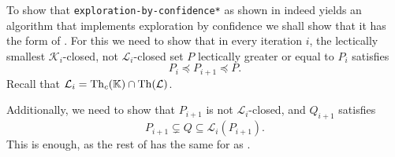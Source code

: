 To show that \lstinline{exploration-by-confidence*} as shown in
 indeed yields an algorithm that implements
exploration by confidence we shall show that it has the form of
.  For this we need to show that in every
iteration $i$, the lectically smallest $\mathcal{K}_{i}$-closed, not
$\mathcal{L}_{i}$-closed set $P$ lectically greater or equal to $P_{i}$ satisfies
\begin{equation}
  \label{eq:46}
  P_{i} \preceq P_{i+1} \preceq P.
\end{equation}
Recall that $\mathcal{L}_{i} = \operatorname{Th}_{c}({\mathbb{K}}) \cap \operatorname{Th}(\mathcal{L})$.

Additionally, we need to show that $P_{i+1}$ is not $\mathcal{L}_{i}$-closed, and
$Q_{i+1}$ satisfies
\begin{equation}
  \label{eq:47}
  P_{i+1} \subsetneq Q \subseteq \mathcal{L}_{i}(P_{i+1}).
\end{equation}
This is enough, as the rest of
 has the same for as
.

